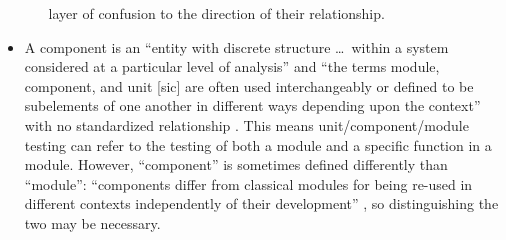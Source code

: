 \begin{itemize}
\begin{itemize}
                        layer of confusion to the direction of their
                        relationship.
            \end{itemize}
      \item %
            A component is an ``entity with discrete structure \dots\ within a
            system considered at a particular level of analysis''
            \citep{ISO_IEC2023b} and ``the terms module, component, and unit
                  [sic] are often used interchangeably or defined to be subelements
            of one another in different ways depending upon the context'' with
            no standardized relationship \citep[p.~82]{IEEE2017}. This means
            unit/component/module testing can refer to the testing of both a
            module and a specific function in a module.
            However, ``component'' is sometimes defined differently than
            ``module'': ``components differ from classical modules for being
            re-used in different contexts independently of their development''
            \citep[p.~107]{BaresiAndPezzè2006}, so distinguishing the two
            may be necessary.
            \ifnotpaper
\end{itemize}

